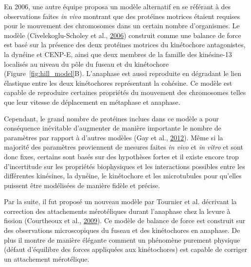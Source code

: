\documentclass[12pt,a4paper,twoside,openright]{book}
\begin{document}
En 2006, une autre équipe proposa un modèle alternatif en se référant à
des observations faites \emph{in vivo} montrant que des protéines
motrices étaient requises pour le mouvement des chromosomes dans un
certain nombre d'organismes. Le modèle (Civelekoglu-Scholey et al.,
\protect\hyperlink{ref-Civelekoglu-Scholey2006}{2006}) construit comme
une balance de force est basé sur la présence des deux protéines
motrices du kinétochore antagonistes, la dynéine et CENP-E, ainsi que
deux membres de la famille des kinésine-13 localisés au niveau du pôle
du fuseau et du kinétochore (Figure~\ref{fig:hill_model}B). L'anaphase
est aussi reproduite en dégradant le lien élastique entre les deux
kinétochores représentant la cohésine. Ce modèle est capable de
reproduire certaines propriétés du mouvement des chromosomes telles que
leur vitesse de déplacement en métaphase et anaphase.

Cependant, le grand nombre de protéines inclues dans ce modèle a pour
conséquence inévitable d'augmenter de manière importante le nombre de
paramètres par rapport à d'autres modèles (Gay et al.,
\protect\hyperlink{ref-Gay2012a}{2012}). Même si la majorité des
paramètres proviennent de mesures faites \emph{in vivo} et \emph{in
vitro} et sont donc fixes, certains sont basés sur des hypothèses fortes
et il existe encore trop d'incertitude sur les propriétés biophysiques
et les interactions possibles entre les différentes kinésines, la
dynéine, le kinétochore et les microtubules pour qu'elles puissent être
modélisées de manière fidèle et précise.

Par la suite, il fut proposé un nouveau modèle par Tournier et al.
décrivant la correction des attachements mérotéliques durant l'anaphase
chez la levure à fission (Courtheoux et al.,
\protect\hyperlink{ref-Courtheoux2009}{2009}). Ce modèle de balance de
force est construit sur des observations microscopiques du fuseau et des
kinétochores en anaphase. De plus il montre de manière élégante comment
un phénomène purement physique (défaut d'équilibre des forces appliquées
aux kinétochores) est capable de corriger un attachement mérotélique.
\end{document}
